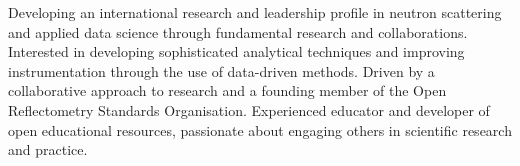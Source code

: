 \vspace{0.25cm}

\begin{cvparagraph}

Developing an international research and leadership profile in neutron scattering and applied data science through fundamental research and collaborations.
Interested in developing sophisticated analytical techniques and improving instrumentation through the use of data-driven methods.
Driven by a collaborative approach to research and a founding member of the Open Reflectometry Standards Organisation.
Experienced educator and developer of open educational resources, passionate about engaging others in scientific research and practice.
\end{cvparagraph}
